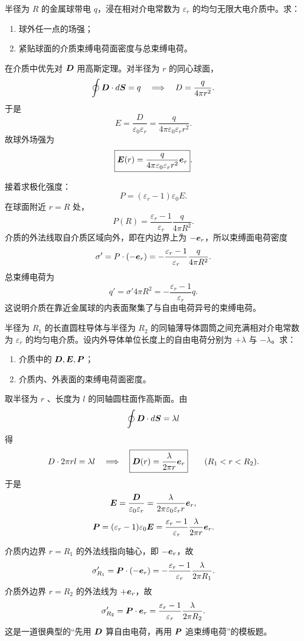 \documentclass[lang=cn,11pt]{elegantbook}
\begin{document}
\begin{example}[浸在均匀电介质中的带电金属球]
半径为 \(R\) 的金属球带电 \(q\)，浸在相对介电常数为 \(\varepsilon_r\) 的均匀无限大电介质中。求：
\begin{enumerate}
  \item 球外任一点的场强；
  \item 紧贴球面的介质束缚电荷面密度与总束缚电荷。
\end{enumerate}
\end{example}

\begin{solution}
在介质中优先对 \(\vb*{D}\) 用高斯定理。对半径为 \(r\) 的同心球面，
\[
\oint \vb*{D}\cdot d\vb*{S}=q
\quad\Longrightarrow\quad
D=\frac{q}{4\pi r^2}.
\]
于是
\[
E=\frac{D}{\varepsilon_0\varepsilon_r}
=\frac{q}{4\pi\varepsilon_0\varepsilon_r r^2}.
\]
故球外场强为
\[
\boxed{
\vb*{E}(r)=\frac{q}{4\pi\varepsilon_0\varepsilon_r r^2}\vb*{e}_r
}.
\]

接着求极化强度：
\[
P=(\varepsilon_r-1)\varepsilon_0E.
\]
在球面附近 \(r=R\) 处，
\[
P(R)=\frac{\varepsilon_r-1}{\varepsilon_r}\frac{q}{4\pi R^2}.
\]
介质的外法线取自介质区域向外，即在内边界上为 \(-\vb*{e}_r\)，所以束缚面电荷密度
\[
\sigma'=P\cdot(-\vb*{e}_r)
=-\frac{\varepsilon_r-1}{\varepsilon_r}\frac{q}{4\pi R^2}.
\]
总束缚电荷为
\[
q'=\sigma'4\pi R^2
=-\frac{\varepsilon_r-1}{\varepsilon_r}q.
\]
这说明介质在靠近金属球的内表面聚集了与自由电荷异号的束缚电荷。
\end{solution}

\begin{example}
半径为 \(R_1\) 的长直圆柱导体与半径为 \(R_2\) 的同轴薄导体圆筒之间充满相对介电常数为 \(\varepsilon_r\) 的均匀电介质。设内外导体单位长度上的自由电荷分别为 \(+\lambda\) 与 \(-\lambda\)。求：
\begin{enumerate}
  \item 介质中的 \(\vb*{D},\vb*{E},\vb*{P}\)；
  \item 介质内、外表面的束缚电荷面密度。
\end{enumerate}
\end{example}

\begin{solution}
取半径为 \(r\) 、长度为 \(l\) 的同轴圆柱面作高斯面。由
\[
\oint \vb*{D}\cdot d\vb*{S}=\lambda l
\]
得
\[
D\cdot 2\pi rl=\lambda l
\quad\Longrightarrow\quad
\boxed{
\vb*{D}(r)=\frac{\lambda}{2\pi r}\vb*{e}_r
}\qquad (R_1<r<R_2).
\]
于是
\[
\vb*{E}=\frac{\vb*{D}}{\varepsilon_0\varepsilon_r}
=\frac{\lambda}{2\pi\varepsilon_0\varepsilon_r r}\vb*{e}_r,
\]
\[
\vb*{P}=(\varepsilon_r-1)\varepsilon_0\vb*{E}
=\frac{\varepsilon_r-1}{\varepsilon_r}\frac{\lambda}{2\pi r}\vb*{e}_r.
\]

介质内边界 \(r=R_1\) 的外法线指向轴心，即 \(-\vb*{e}_r\)，故
\[
\sigma'_{R_1}=\vb*{P}\cdot(-\vb*{e}_r)
=-\frac{\varepsilon_r-1}{\varepsilon_r}\frac{\lambda}{2\pi R_1}.
\]
介质外边界 \(r=R_2\) 的外法线为 \(+\vb*{e}_r\)，故
\[
\sigma'_{R_2}=\vb*{P}\cdot\vb*{e}_r
=\frac{\varepsilon_r-1}{\varepsilon_r}\frac{\lambda}{2\pi R_2}.
\]
这是一道很典型的“先用 \(\vb*{D}\) 算自由电荷，再用 \(\vb*{P}\) 追束缚电荷”的模板题。
\end{solution}
\end{document}
